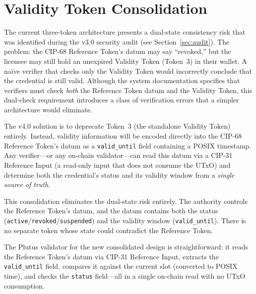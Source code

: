 \section{Validity Token Consolidation}
\label{sec:validity-consolidation}

The current three-token architecture presents a dual-state consistency risk
that was identified during the v3.0 security audit (see
Section~\ref{sec:audit}).  The problem: the CIP-68 Reference Token's datum
may say ``revoked,'' but the licensee may still hold an unexpired Validity
Token (Token~3) in their wallet.  A na\"ive verifier that checks only the
Validity Token would incorrectly conclude that the credential is still
valid.  Although the system documentation specifies that verifiers must check
\emph{both} the Reference Token datum and the Validity Token, this dual-check
requirement introduces a class of verification errors that a simpler
architecture would eliminate.

The v4.0 solution is to deprecate Token~3 (the standalone Validity Token)
entirely.  Instead, validity information will be encoded directly into the
CIP-68 Reference Token's datum as a \texttt{valid\_until} field containing a
POSIX timestamp.  Any verifier---or any on-chain validator---can read this
datum via a CIP-31 Reference Input (a read-only input that does not consume
the UTxO) and determine both the credential's status and its validity
window from a \emph{single source of truth}.

This consolidation eliminates the dual-state risk entirely.  The authority
controls the Reference Token's datum, and the datum contains both the status
(\texttt{active}/\texttt{revoked}/\texttt{suspended}) and the validity
window (\texttt{valid\_until}).  There is no separate token whose state
could contradict the Reference Token.

The Plutus validator for the new consolidated design is straightforward: it
reads the Reference Token's datum via CIP-31 Reference Input, extracts the
\texttt{valid\_until} field, compares it against the current slot
(converted to POSIX time), and checks the \texttt{status} field---all in a
single on-chain read with no UTxO consumption.

